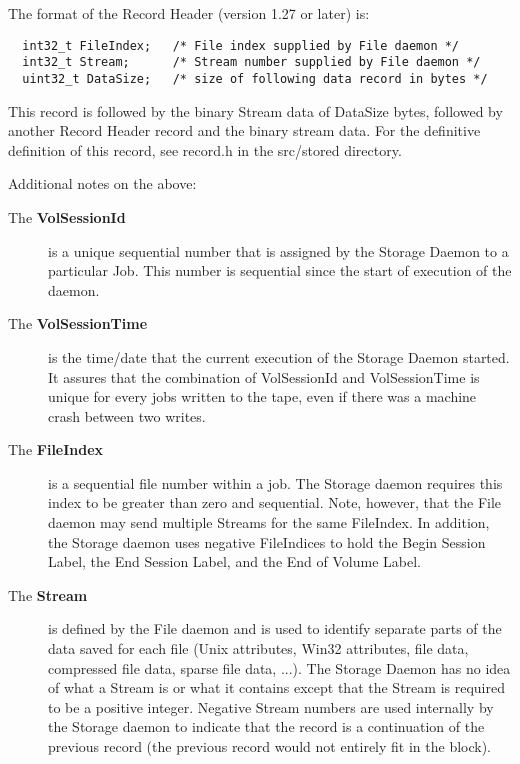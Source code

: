 The format of the Record Header (version 1.27 or later) is: 

\footnotesize
\begin{verbatim}
  int32_t FileIndex;   /* File index supplied by File daemon */
  int32_t Stream;      /* Stream number supplied by File daemon */
  uint32_t DataSize;   /* size of following data record in bytes */
\end{verbatim}
\normalsize

This record is followed by the binary Stream data of DataSize bytes, followed
by another Record Header record and the binary stream data. For the definitive
definition of this record, see record.h in the src/stored directory. 

Additional notes on the above: 

\begin{description}

\item [The {\bf VolSessionId} ]
   is a unique sequential number that is  assigned by the Storage Daemon to a
particular Job. This number  is sequential since the start of execution of the
daemon. 

\item [The {\bf VolSessionTime} ]
   is the time/date that the current execution  of the Storage Daemon started. It
assures that the combination of  VolSessionId and VolSessionTime is unique for
every jobs written  to the tape, even if there was a machine crash between two
writes. 

\item [The {\bf FileIndex} ]
   is a sequential file number within a job.  The Storage daemon requires this
index to be greater than zero and  sequential. Note, however, that the File
daemon may send multiple  Streams for the same FileIndex. In addition, the
Storage daemon uses  negative FileIndices to hold the Begin Session Label, the
End Session  Label, and the End of Volume Label. 

\item [The {\bf Stream} ]
   is defined by the File daemon and is  used to identify separate parts of the
data saved for each file  (Unix attributes, Win32 attributes, file data,
compressed file data,  sparse file data, ...). The Storage Daemon has no idea 
of what a Stream is or what it contains except that the Stream  is required to
be a positive integer. Negative Stream numbers are  used internally by the
Storage daemon to indicate that the record  is a continuation of the previous
record (the previous record would  not entirely fit in the block).  


\end{description}
